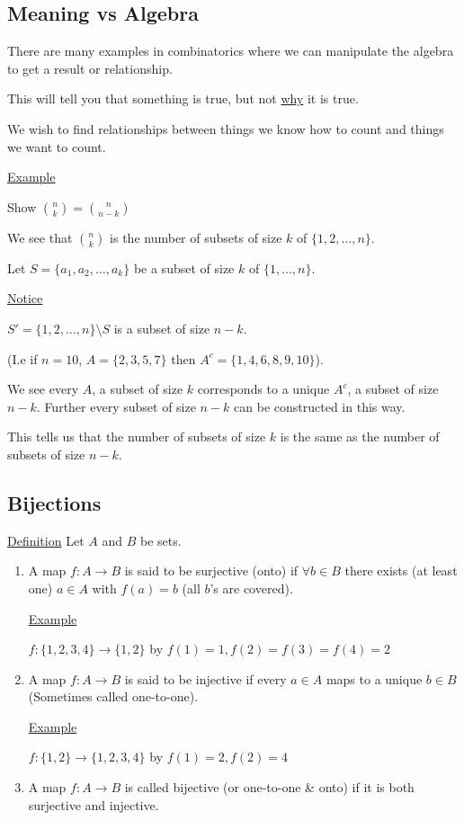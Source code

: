 \documentclass{article}
\begin{document}
\subsection{Meaning vs Algebra}

There are many examples in combinatorics where we can manipulate the algebra to get a result or relationship. 

This will tell you that something is true, but not \underline{why} it is true. 

We wish to find relationships between things we know how to count and things we want to count. 

\underline{Example}

Show $\binom{n}{k} = \binom{n}{n-k}$

We see that $\binom{n}{k}$ is the number of subsets of size $k$ of $\{1,2,\ldots,n\}$.

Let $S = \{a_1,a_2,\ldots,a_k\}$ be a subset of size $k$ of $\{1,\ldots,n\}$. 

\underline{Notice}

$S' = \{1,2,\ldots,n\} \setminus S$ is a subset of size $n-k$. 

(I.e if $n=10$, $A = \{2,3,5,7\}$ then $A^c = \{1,4,6,8,9,10\}$). 

We see every $A$, a subset of size $k$ corresponds to a unique $A^c$, a subset of size $n-k$. Further every subset of size $n-k$ can be constructed in this way. 

This tells us that the number of subsets of size $k$ is the same as the number of subsets of size $n-k$. 


\subsection{Bijections}

\underline{Definition} Let $A$ and $B$ be sets.

\begin{enumerate}
    \item A map $f: A \to B $ is said to be surjective (onto) if $\forall b \in B$ there exists (at least one) $a \in A$ with $f(a)=b$ (all $b$'s are covered). 

\underline{Example}

$f: \{1,2,3,4\} \to \{1,2\}$ by $f(1) = 1, f(2) = f(3) = f(4) = 2$

\item A map $f: A \to B$ is said to be injective if every $a \in A$ maps to a unique $b \in B$ (Sometimes called one-to-one). 

\underline{Example}

$f: \{1,2\} \to \{1,2,3,4\}$ by $f(1) = 2, f(2) = 4$

\item A map $f: A \to B$ is called bijective (or one-to-one \& onto) if it is both surjective and injective.

\end{enumerate}
\end{document}
